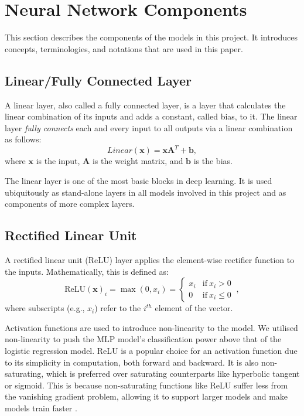 \documentclass{l4proj}
\begin{document}
\section{Neural Network Components}
This section describes the components of the models in this project. It introduces concepts, terminologies, and notations that are used in this paper.

\subsection{Linear/Fully Connected Layer}
A linear layer, also called a fully connected layer, is a layer that calculates the linear combination of its inputs and adds a constant, called bias, to it. The linear layer \emph{fully connects} each and every input to all outputs via a linear combination as follows:
\begin{equation}
    Linear(\boldsymbol{x}) = \boldsymbol{x} \boldsymbol{A}^T + \boldsymbol{b},
\end{equation}
where $\boldsymbol{x}$ is the input, $\boldsymbol{A}$ is the weight matrix, and $\boldsymbol{b}$ is the bias.

The linear layer is one of the most basic blocks in deep learning. It is used ubiquitously as stand-alone layers in all models involved in this project and as components of more complex layers.

\subsection{Rectified Linear Unit}
A rectified linear unit (ReLU) layer applies the element-wise rectifier function to the inputs. Mathematically, this is defined as:
\begin{equation}
    \text{ReLU}(\boldsymbol{x})_i = \max(0, x_i) = 
    \begin{cases}
        x_i & \text{if} \ x_i > 0 \\
        0 & \text{if} \ x_i \leq 0
    \end{cases}
    \ ,
\end{equation}
where subscripts (e.g., $x_i$) refer to the $i^{th}$ element of the vector.

Activation functions are used to introduce non-linearity to the model. We utilised non-linearity to push the MLP model's classification power above that of the logistic regression model. ReLU is a popular choice for an activation function due to its simplicity in computation, both forward and backward. It is also non-saturating, which is preferred over saturating counterparts like hyperbolic tangent or sigmoid. This is because non-saturating functions like ReLU suffer less from the vanishing gradient problem, allowing it to support larger models and make models train faster \citep{glorot2011, krizhevsky2017}.
\end{document}
